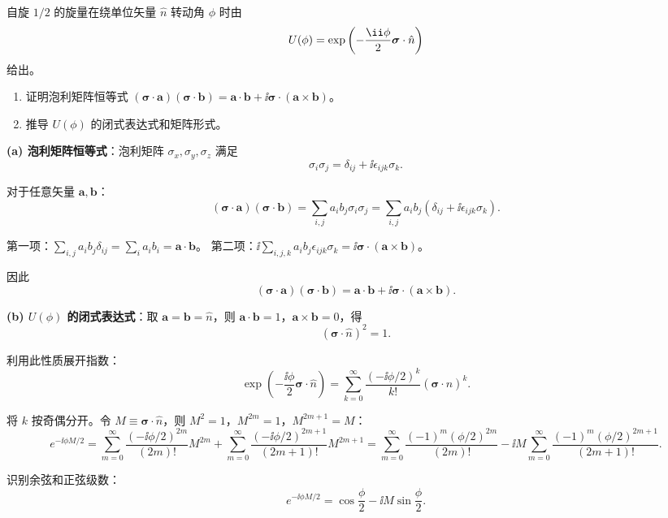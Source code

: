 \begin{question}
自旋 $1/2$ 的旋量在绕单位矢量 $\hat n$ 转动角 $\phi$ 时由
\[
U(\phi)=\exp\left(-{\ii\phi\over2}\boldsymbol\sigma\cdot\hat n\right)
\]
给出。
\begin{enumerate}
\item 证明泡利矩阵恒等式 $(\boldsymbol\sigma\cdot\mathbf a)(\boldsymbol\sigma\cdot\mathbf b)=\mathbf a\cdot\mathbf b+\ii\boldsymbol\sigma\cdot(\mathbf a\times\mathbf b)$。
\item 推导 $U(\phi)$ 的闭式表达式和矩阵形式。
\end{enumerate}
\end{question}
\begin{solution}
	\textbf{(a) 泡利矩阵恒等式}：泡利矩阵 $\sigma_x,\sigma_y,\sigma_z$ 满足
	\[
	\sigma_i\sigma_j = \delta_{ij} + \ii\epsilon_{ijk}\sigma_k.
	\]

	对于任意矢量 $\mathbf a,\mathbf b$：
	\[
	(\boldsymbol\sigma\cdot\mathbf a)(\boldsymbol\sigma\cdot\mathbf b)
	= \sum_{i,j} a_i b_j \sigma_i\sigma_j
	= \sum_{i,j} a_i b_j (\delta_{ij} + \ii\epsilon_{ijk}\sigma_k).
	\]

	第一项：$\sum_{i,j} a_i b_j \delta_{ij} = \sum_i a_i b_i = \mathbf a\cdot\mathbf b$。
	第二项：$\ii\sum_{i,j,k} a_i b_j \epsilon_{ijk}\sigma_k = \ii\boldsymbol\sigma\cdot(\mathbf a\times\mathbf b)$。

	因此
	\[
	\boxed{(\boldsymbol\sigma\cdot\mathbf a)(\boldsymbol\sigma\cdot\mathbf b)
	= \mathbf a\cdot\mathbf b + \ii\boldsymbol\sigma\cdot(\mathbf a\times\mathbf b)}.
	\]

	\textbf{(b) $U(\phi)$ 的闭式表达式}：取 $\mathbf a=\mathbf b=\hat n$，则 $\mathbf a\cdot\mathbf b=1$，$\mathbf a\times\mathbf b=0$，得
	\[
	(\boldsymbol\sigma\cdot\hat n)^2 = 1.
	\]

	利用此性质展开指数：
	\[
	\exp\!\left(-\frac{\ii\phi}{2}\boldsymbol\sigma\cdot\hat n\right)
	= \sum_{k=0}^\infty \frac{(-\ii\phi/2)^k}{k!}(\boldsymbol\sigma\cdot\hat n)^k.
	\]

	将 $k$ 按奇偶分开。令 $M \equiv \boldsymbol\sigma\cdot\hat n$，则 $M^2=1$，$M^{2m}=1$，$M^{2m+1}=M$：
	\[
	e^{-\ii\phi M/2}
	= \sum_{m=0}^\infty \frac{(-\ii\phi/2)^{2m}}{(2m)!} M^{2m}
	+ \sum_{m=0}^\infty \frac{(-\ii\phi/2)^{2m+1}}{(2m+1)!} M^{2m+1}
	= \sum_{m=0}^\infty \frac{(-1)^m(\phi/2)^{2m}}{(2m)!}
	- \ii M\sum_{m=0}^\infty \frac{(-1)^m(\phi/2)^{2m+1}}{(2m+1)!}.
	\]

	识别余弦和正弦级数：
	\[
	e^{-\ii\phi M/2} = \cos\frac{\phi}{2} - \ii M\sin\frac{\phi}{2}.
	\]


\end{solution}
